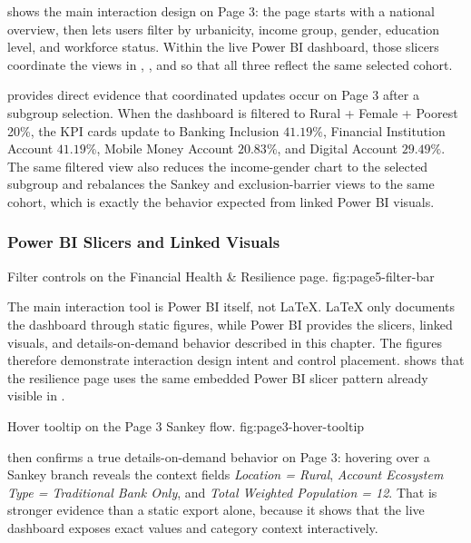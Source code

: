 \documentclass[../main.tex]{subfiles}
\begin{document}
 shows the
main interaction design
on Page 3: the page starts with a national overview, then lets users filter by
urbanicity, income group, gender, education level, and workforce status.
Within the live Power BI dashboard, those slicers coordinate the views in
,
, and
 so that all three
reflect the same selected cohort.

 provides
direct evidence that coordinated
updates occur on Page 3 after a subgroup selection. When the dashboard is
filtered to Rural + Female + Poorest 20\%, the KPI cards update to Banking
Inclusion \(41.19\%\), Financial Institution Account \(41.19\%\), Mobile Money
Account \(20.83\%\), and Digital Account \(29.49\%\). The same filtered view
also reduces the income-gender chart to the selected subgroup and rebalances
the Sankey and exclusion-barrier views to the same cohort, which is exactly the
behavior expected from linked Power BI visuals.

\subsubsection{Power BI Slicers and Linked Visuals}

{Filter controls on the Financial Health \& Resilience page.}
{fig:page5-filter-bar}

The main interaction tool is Power BI itself, not LaTeX. LaTeX only documents
the dashboard through static figures, while Power BI provides the slicers,
linked visuals, and details-on-demand behavior described in this chapter. The
figures therefore demonstrate interaction design intent and control placement.
 shows that the resilience
page uses the same embedded Power BI slicer pattern already visible in
.

{Hover tooltip on the Page 3 Sankey flow.}
{fig:page3-hover-tooltip}

 then confirms a true
details-on-demand behavior on Page 3: hovering over a Sankey branch reveals the
context fields \textit{Location = Rural}, \textit{Account Ecosystem Type =
Traditional Bank Only}, and \textit{Total Weighted Population = 12}. That is
stronger evidence than a static export alone, because it shows that the live
dashboard exposes exact values and category context interactively.
\end{document}
